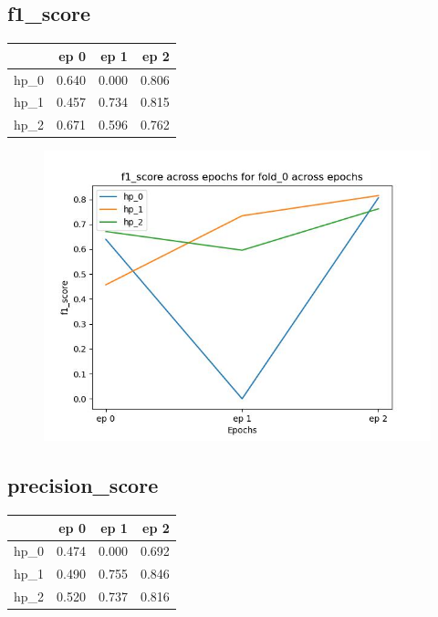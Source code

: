 \documentclass{article}
\begin{document}
\subsection{f1\_score}
\begin{tabular}{lrrr}
\toprule
{} &   ep 0 &   ep 1 &   ep 2 \\
\midrule
hp\_0 &  0.640 &  0.000 &  0.806 \\
hp\_1 &  0.457 &  0.734 &  0.815 \\
hp\_2 &  0.671 &  0.596 &  0.762 \\
\bottomrule
\end{tabular}

\begin{figure}[H]
\includegraphics[scale = 0.75]{fold_0/f1_score}
\end{figure}
\subsection{precision\_score}
\begin{tabular}{lrrr}
\toprule
{} &   ep 0 &   ep 1 &   ep 2 \\
\midrule
hp\_0 &  0.474 &  0.000 &  0.692 \\
hp\_1 &  0.490 &  0.755 &  0.846 \\
hp\_2 &  0.520 &  0.737 &  0.816 \\
\bottomrule
\end{tabular}
\end{document}
